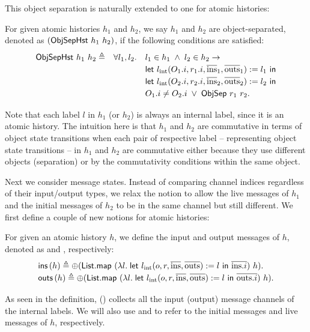 This object separation is naturally extended to one for atomic histories:
\begin{definition}\label{def-obj-comm}
  For given atomic histories $h_1$ and $h_2$, we say $h_1$ and $h_2$ are object-separated, denoted as $(\mathsf{ObjSepHst}\ h_1\ h_2)$, if the following conditions are satisfied:
  \begin{displaymath}
    \renewcommand{\arraystretch}{1.2}
    \begin{array}{rcl}
      \objseph{h_1}{h_2} \triangleq & \forall l_1, l_2. & l_1 \in h_1 \;\wedge\; l_2 \in h_2 \to\\
      & & \mathsf{let}\ \lblInt{\idxOf{O_1}}{\idxOf{r_1}}{\listof{\mathrm{ins}}_1}{\listof{\mathrm{outs}}_1} := l_1\ \mathsf{in}\\
      & & \mathsf{let}\ \lblInt{\idxOf{O_2}}{\idxOf{r_2}}{\listof{\mathrm{ins}}_2}{\listof{\mathrm{outs}}_2} := l_2\ \mathsf{in}\\
      & & \idxOf{O_1} \neq \idxOf{O_2} \;\vee\; \objsep{r_1}{r_2}.
    \end{array}
  \end{displaymath}
\end{definition}
Note that each label $l$ in $h_1$ (or $h_2$) is always an internal label, since it is an atomic history.
The intuition here is that $h_1$ and $h_2$ are commutative in terms of object state transitions when each pair of respective label -- representing object state transitions -- in $h_1$ and $h_2$ are commutative either because they use different objects (separation) or by the commutativity conditions within the same object.

Next we consider message states.
Instead of comparing channel indices regardless of their input/output types, we relax the notion to allow the live messages of $h_1$ and the initial messages of $h_2$ to be in the same channel but still different.
We first define a couple of new notions for atomic histories:
\begin{definition}
  For given an atomic history $h$, we define the input and output messages of $h$, denoted as  and , respectively:
  \begin{displaymath}
    \renewcommand{\arraystretch}{1.2}
    \begin{array}{l}
      \ainputs{h} \triangleq \listconcat{(\mathsf{List.map}\ (\lambda l.\; \mathsf{let}\ \lblInt{o}{r}{\listof{\mathrm{ins}}}{\listof{\mathrm{outs}}} := l\ \mathsf{in}\ \listof{\idxOf{\mathrm{ins}}})\ h)}.\\
      \aoutputs{h} \triangleq \listconcat{(\mathsf{List.map}\ (\lambda l.\; \mathsf{let}\ \lblInt{o}{r}{\listof{\mathrm{ins}}}{\listof{\mathrm{outs}}} := l\ \mathsf{in}\ \listof{\idxOf{\mathrm{outs}}})\ h)}.
    \end{array}
  \end{displaymath}
\end{definition}
As seen in the definition,  () collects all the input (output) message channels of the internal labels.
We will also use  and  to refer to the initial messages and live messages of $h$, respectively.


